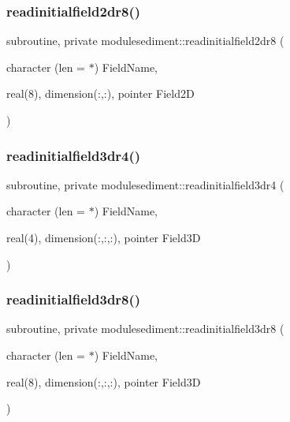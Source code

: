 \subsubsection{\texorpdfstring{readinitialfield2dr8()}{readinitialfield2dr8()}}
{\footnotesize\ttfamily subroutine, private modulesediment\+::readinitialfield2dr8 (\begin{DoxyParamCaption}\item[{character (len = $\ast$)}]{Field\+Name,  }\item[{real(8), dimension(\+:,\+:), pointer}]{Field2D }\end{DoxyParamCaption})\hspace{0.3cm}{\ttfamily [private]}}

\mbox{\label{namespacemodulesediment_a3b0c5a0377f0ab98b49b4e9d86627278}} 
\subsubsection{\texorpdfstring{readinitialfield3dr4()}{readinitialfield3dr4()}}
{\footnotesize\ttfamily subroutine, private modulesediment\+::readinitialfield3dr4 (\begin{DoxyParamCaption}\item[{character (len = $\ast$)}]{Field\+Name,  }\item[{real(4), dimension(\+:,\+:,\+:), pointer}]{Field3D }\end{DoxyParamCaption})\hspace{0.3cm}{\ttfamily [private]}}

\mbox{\label{namespacemodulesediment_a546771f8f141f33b0a8d1aa803131737}} 
\subsubsection{\texorpdfstring{readinitialfield3dr8()}{readinitialfield3dr8()}}
{\footnotesize\ttfamily subroutine, private modulesediment\+::readinitialfield3dr8 (\begin{DoxyParamCaption}\item[{character (len = $\ast$)}]{Field\+Name,  }\item[{real(8), dimension(\+:,\+:,\+:), pointer}]{Field3D }\end{DoxyParamCaption})\hspace{0.3cm}{\ttfamily [private]}}

